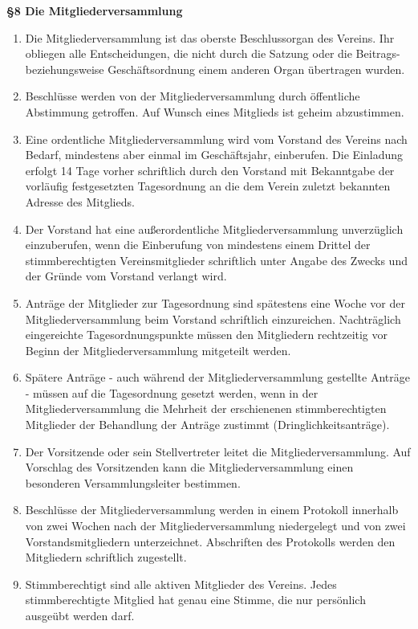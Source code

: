 \documentclass[a4paper,
               12pt,
               titlepage,
               parskip=half]{scrartcl}
\begin{document}
\textbf{§8 Die Mitgliederversammlung}
{\small
	\begin{enumerate}
		\item Die Mitgliederversammlung ist das oberste Beschlussorgan des Vereins. Ihr obliegen alle Entscheidungen, die nicht durch die Satzung oder die Beitrags- beziehungsweise Geschäftsordnung einem anderen Organ übertragen wurden.
		\item Beschlüsse werden von der Mitgliederversammlung durch öffentliche Abstimmung getroffen. Auf Wunsch eines Mitglieds ist geheim abzustimmen.
		\item Eine ordentliche Mitgliederversammlung wird vom Vorstand des Vereins nach Bedarf, mindestens aber einmal im Geschäftsjahr, einberufen. Die Einladung erfolgt 14 Tage vorher schriftlich durch den Vorstand mit Bekanntgabe der vorläufig festgesetzten Tagesordnung an die dem Verein zuletzt bekannten Adresse des Mitglieds.
		\item Der Vorstand hat eine außerordentliche Mitgliederversammlung unverzüglich einzuberufen,
		wenn die Einberufung von mindestens einem Drittel der stimmberechtigten Vereinsmitglieder schriftlich unter Angabe des Zwecks und der Gründe vom Vorstand verlangt wird.
		\item Anträge der Mitglieder zur Tagesordnung sind spätestens eine Woche vor der Mitgliederversammlung beim Vorstand schriftlich einzureichen. Nachträglich eingereichte Tagesordnungspunkte müssen den Mitgliedern rechtzeitig vor Beginn der Mitgliederversammlung mitgeteilt werden.
		\item Spätere Anträge - auch während der Mitgliederversammlung gestellte Anträge - müssen auf die Tagesordnung gesetzt werden, wenn in der Mitgliederversammlung die Mehrheit der erschienenen stimmberechtigten Mitglieder der Behandlung der Anträge zustimmt (Dringlichkeitsanträge).
		\item Der Vorsitzende oder sein Stellvertreter leitet die Mitgliederversammlung. Auf Vorschlag des Vorsitzenden kann die Mitgliederversammlung einen besonderen Versammlungsleiter bestimmen.
		\item Beschlüsse der Mitgliederversammlung werden in einem Protokoll innerhalb von zwei Wochen nach der Mitgliederversammlung niedergelegt und von zwei Vorstandsmitgliedern unterzeichnet. Abschriften des Protokolls werden den Mitgliedern schriftlich zugestellt.
		\item Stimmberechtigt sind alle aktiven Mitglieder des Vereins. Jedes stimmberechtigte Mitglied hat genau eine Stimme, die nur persönlich ausgeübt werden darf.

\end{enumerate}}
\end{document}
